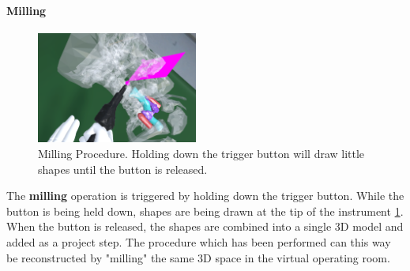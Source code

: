 \paragraph{Milling}

\begin{figure}[ht]
    \centering
    \includegraphics[width=200px]{images/implementation/features/procedures/bonesaw.png}
    \caption{\label{fig::FeaturePiezo}Milling Procedure. Holding down the trigger button will draw little shapes until the button is released.}
\end{figure}

The \textbf{milling} operation is triggered by holding down the trigger button.
While the button is being held down, shapes are being drawn at the tip of the instrument \ref{fig::FeaturePiezo}.
When the button is released, the shapes are combined into a single 3D model and added as a project step.
The procedure which has been performed can this way be reconstructed by "milling" the same 3D space in the virtual operating room.